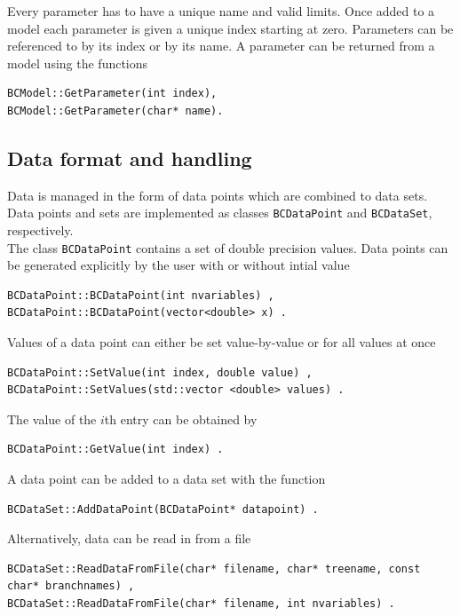 \documentclass[11pt, a4paper]{article}
\begin{document}
\noindent 
Every parameter has to have a unique name and valid limits. Once added
to a model each parameter is given a unique index starting at
zero. Parameters can be referenced to by its index or by its name. A
parameter can be returned from a model using the functions
% 
\begin{verbatim} 
BCModel::GetParameter(int index), 
BCModel::GetParameter(char* name). 
\end{verbatim}  


\subsection{Data format and handling} 
\label{subsection:data} 

Data is managed in the form of data points which are combined to data
sets. Data points and sets are implemented as classes
\verb|BCDataPoint| and \verb|BCDataSet|, respectively. \\ 

\noindent 
The class \verb|BCDataPoint| contains a set of double precision
values. Data points can be generated explicitly by the user with or
without intial value
%
\begin{verbatim} 
BCDataPoint::BCDataPoint(int nvariables) ,
BCDataPoint::BCDataPoint(vector<double> x) .  
\end{verbatim} 

\noindent 
Values of a data point can either be set value-by-value or for all
values at once
%
\begin{verbatim} 
BCDataPoint::SetValue(int index, double value) , 
BCDataPoint::SetValues(std::vector <double> values) . 
\end{verbatim} 

\noindent 
The value of the $i$th entry can be obtained by 
%
\begin{verbatim}
BCDataPoint::GetValue(int index) . 
\end{verbatim} 

\noindent 
A data point can be added to a data set with the function

\begin{verbatim} 
BCDataSet::AddDataPoint(BCDataPoint* datapoint) . 
\end{verbatim} 

\noindent 
Alternatively, data can be read in from a file
%
\begin{small}
\begin{verbatim}
BCDataSet::ReadDataFromFile(char* filename, char* treename, const char* branchnames) ,
BCDataSet::ReadDataFromFile(char* filename, int nvariables) .
\end{verbatim} 
\end{small} 
\end{document}
